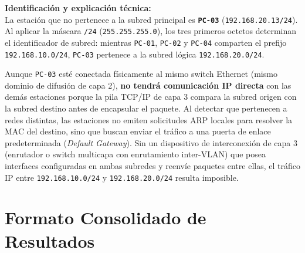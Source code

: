 \documentclass[11pt, a4paper]{article}
\begin{document}
\noindent \textbf{Identificación y explicación técnica:} \\
La estación que no pertenece a la subred principal es \textbf{\texttt{PC-03}} (\texttt{192.168.20.13/24}). Al aplicar la máscara \texttt{/24} (\texttt{255.255.255.0}), los tres primeros octetos determinan el identificador de subred: mientras \texttt{PC-01}, \texttt{PC-02} y \texttt{PC-04} comparten el prefijo \texttt{192.168.10.0/24}, \texttt{PC-03} pertenece a la subred lógica \texttt{192.168.20.0/24}.

Aunque \texttt{PC-03} esté conectada físicamente al mismo switch Ethernet (mismo dominio de difusión de capa 2), \textbf{no tendrá comunicación IP directa} con las demás estaciones porque la pila TCP/IP de capa 3 compara la subred origen con la subred destino antes de encapsular el paquete. Al detectar que pertenecen a redes distintas, las estaciones no emiten solicitudes ARP locales para resolver la MAC del destino, sino que buscan enviar el tráfico a una puerta de enlace predeterminada (\textit{Default Gateway}). Sin un dispositivo de interconexión de capa 3 (enrutador o switch multicapa con enrutamiento inter-VLAN) que posea interfaces configuradas en ambas subredes y reenvíe paquetes entre ellas, el tráfico IP entre \texttt{192.168.10.0/24} y \texttt{192.168.20.0/24} resulta imposible.

\section{Formato Consolidado de Resultados}
\end{document}
